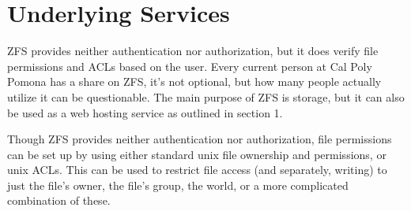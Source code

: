 \section{Underlying Services}

ZFS provides neither authentication nor authorization, but it does verify file permissions and ACLs based on the user. Every current person at Cal Poly Pomona has a share on ZFS, it's not optional, but how many people actually utilize it can be questionable. The main purpose of ZFS is storage, but it can also be used as a web hosting service as outlined in section 1.

Though ZFS provides neither authentication nor authorization, file permissions can be set up by using either standard unix file ownership and permissions, or unix ACLs. This can be used to restrict file access (and separately, writing) to just the file's owner, the file's group, the world, or a more complicated combination of these.
